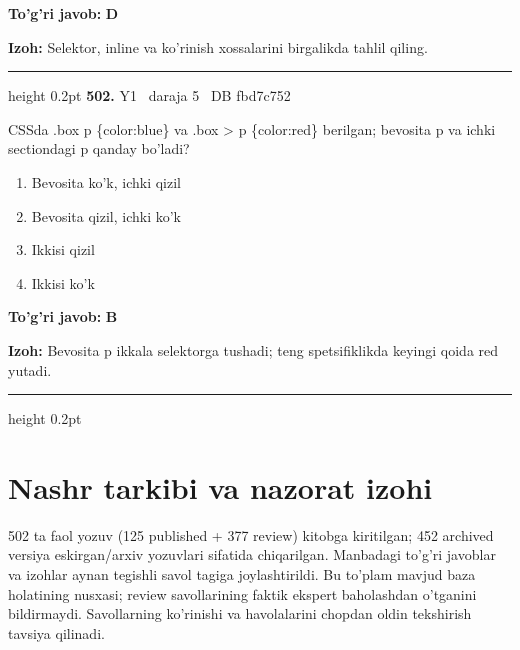 \documentclass[10pt,a4paper,oneside]{article}
\begin{document}
\begin{tcolorbox}[enhanced,breakable,colback=teal!4,colframe=teal!45!black,boxrule=0.45pt,arc=1.2mm,left=2.8mm,right=2.8mm,top=2mm,bottom=2mm,before skip=2mm,after skip=2mm]
\textbf{\color{teal}To'g'ri javob:} \textbf{D}
\par\smallskip
\textbf{Izoh:} Selektor, inline va ko'rinish xossalarini birgalikda tahlil qiling.
\end{tcolorbox}
\vspace{2mm}\hrule height 0.2pt \vspace{4mm}
\hypertarget{q502}{\textbf{\color{ink}502.}}  {\color{muted}\scriptsize Y1 \textbullet\ daraja 5 \textbullet\ DB fbd7c752}
\par
CSSda .box p \{color:blue\} va .box \textgreater{} p \{color:red\} berilgan; bevosita p va ichki sectiondagi p qanday bo'ladi?
\begin{enumerate}[label=\Alph*),leftmargin=9mm]
\item Bevosita ko'k, ichki qizil
\item Bevosita qizil, ichki ko'k
\item Ikkisi qizil
\item Ikkisi ko'k
\end{enumerate}
\begin{tcolorbox}[enhanced,breakable,colback=teal!4,colframe=teal!45!black,boxrule=0.45pt,arc=1.2mm,left=2.8mm,right=2.8mm,top=2mm,bottom=2mm,before skip=2mm,after skip=2mm]
\textbf{\color{teal}To'g'ri javob:} \textbf{B}
\par\smallskip
\textbf{Izoh:} Bevosita p ikkala selektorga tushadi; teng spetsifiklikda keyingi qoida red yutadi.
\end{tcolorbox}
\vspace{2mm}\hrule height 0.2pt \vspace{4mm}
\clearpage\section{Nashr tarkibi va nazorat izohi}
502 ta faol yozuv (125 published + 377 review) kitobga kiritilgan; 452 archived versiya eskirgan/arxiv yozuvlari sifatida chiqarilgan.
Manbadagi to'g'ri javoblar va izohlar aynan tegishli savol tagiga joylashtirildi.
Bu to'plam mavjud baza holatining nusxasi; review savollarining faktik ekspert baholashdan o'tganini bildirmaydi.
Savollarning ko'rinishi va havolalarini chopdan oldin tekshirish tavsiya qilinadi.
\end{document}
